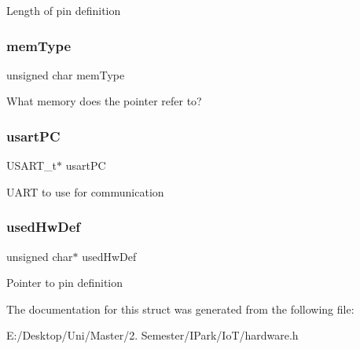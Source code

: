Length of pin definition \mbox{\label{struct_h_w___d_e_f__t_adc6539f9268f7a55973aa310013a9e8f}} 
\subsubsection{\texorpdfstring{mem\+Type}{memType}}
{\footnotesize\ttfamily unsigned char mem\+Type}

What memory does the pointer refer to? \mbox{\label{struct_h_w___d_e_f__t_a76e679a4a31621b37c55dcc24f841e95}} 
\subsubsection{\texorpdfstring{usart\+PC}{usartPC}}
{\footnotesize\ttfamily U\+S\+A\+R\+T\+\_\+t$\ast$ usart\+PC}

U\+A\+RT to use for communication \mbox{\label{struct_h_w___d_e_f__t_af1482ffe338f49d3705da83e7de3538d}} 
\subsubsection{\texorpdfstring{used\+Hw\+Def}{usedHwDef}}
{\footnotesize\ttfamily unsigned char$\ast$ used\+Hw\+Def}

Pointer to pin definition 

The documentation for this struct was generated from the following file\+:\begin{DoxyCompactItemize}
\item 
E\+:/\+Desktop/\+Uni/\+Master/2. Semester/\+I\+Park/\+Io\+T/hardware.\+h\end{DoxyCompactItemize}
